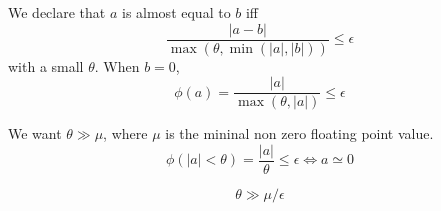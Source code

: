 \documentclass[aps,12pt]{revtex4}
\begin{document}
We declare that $a$ is almost equal to $b$ iff
\begin{equation}
	\dfrac{\vert a - b \vert}{ \max(\theta,\min(\vert a \vert,\vert b \vert)) } \leq \epsilon
\end{equation}
with a small $\theta$.
When $b=0$, 
\begin{equation}
	\phi(a) = \dfrac{\vert a \vert }{ \max(\theta,\vert a \vert) } \leq \epsilon
\end{equation}

We want $\theta \gg \mu$, where $\mu$ is the mininal non zero floating point value.
\begin{equation}
\phi(|a|<\theta) = \dfrac{|a|}{\theta} \leq \epsilon \iff a \simeq 0
\end{equation}

\begin{equation}
	\theta \gg \mu / \epsilon
\end{equation} 	

 	
 	
\end{document}
